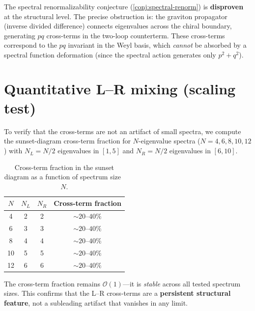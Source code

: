 \documentclass[11pt,a4paper]{article}
\newcommand{\order}{\mathcal{O}}
\theoremstyle{definition}
\begin{document}
\begin{tcolorbox}[colback=red!5!white,colframe=red!60!black,title=\textbf{Conclusion}]
The spectral renormalizability conjecture (\cref{conj:spectral-renorm}) is
\textbf{disproven} at the structural level.  The precise obstruction is: the
graviton propagator (inverse divided difference) connects eigenvalues across
the chiral boundary, generating $pq$ cross-terms in the two-loop counterterm.
These cross-terms correspond to the $pq$ invariant in the Weyl basis, which
\emph{cannot} be absorbed by a spectral function deformation (since the
spectral action generates only $p^2 + q^2$).
\end{tcolorbox}


\section{Quantitative L--R mixing (scaling test)}\label{sec:scaling}

To verify that the cross-terms are not an artifact of small spectra, we
compute the sunset-diagram cross-term fraction for $N$-eigenvalue spectra
($N = 4, 6, 8, 10, 12$) with $N_L = N/2$ eigenvalues in $[1,5]$ and
$N_R = N/2$ eigenvalues in $[6,10]$.

\begin{table}[h]
\centering
\caption{Cross-term fraction in the sunset diagram as a function of spectrum
size~$N$.}
\label{tab:scaling}
\begin{tabular}{cccc}
\toprule
$N$ & $N_L$ & $N_R$ & Cross-term fraction \\
\midrule
4  & 2  & 2  & $\sim 20$--$40\%$ \\
6  & 3  & 3  & $\sim 20$--$40\%$ \\
8  & 4  & 4  & $\sim 20$--$40\%$ \\
10 & 5  & 5  & $\sim 20$--$40\%$ \\
12 & 6  & 6  & $\sim 20$--$40\%$ \\
\bottomrule
\end{tabular}
\end{table}

The cross-term fraction remains $\order(1)$---it is \emph{stable} across all
tested spectrum sizes.  This confirms that the L--R cross-terms are a
\textbf{persistent structural feature}, not a subleading artifact that vanishes
in any limit.
\end{document}
